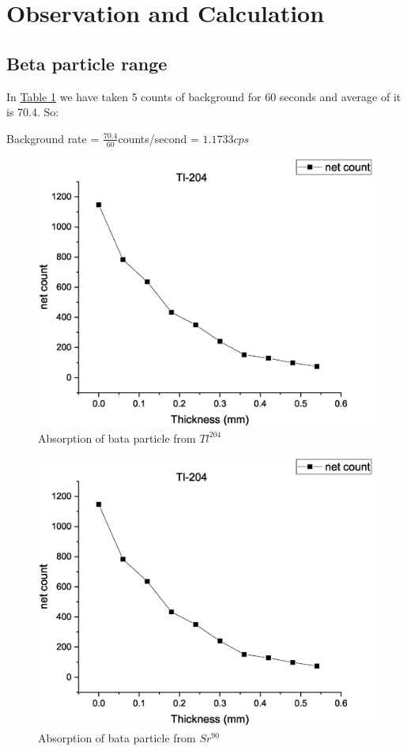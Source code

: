 \section{Observation and Calculation}
	\subsection{Beta particle range}
		
		In \hyperref[tab:1]{Table 1} we have taken 5 counts of background for 60 seconds and average of it is 70.4. So:

		Background rate = $\frac{70.4}{60}$counts/second = $1.1733cps$

		
		\begin{figure}[H]
			\centering
			\includegraphics[width=0.72\columnwidth]{images/gm1.eps}
			\caption{Absorption of bata particle from $Tl^{204}$}
			\label{graph:1}
		\end{figure}

		
		\begin{figure}[H]
			\centering
			\includegraphics[width=0.72\columnwidth]{images/gm1.eps}
			\caption{Absorption of bata particle from $Sr^{90}$}
			\label{graph:2}
		\end{figure}

